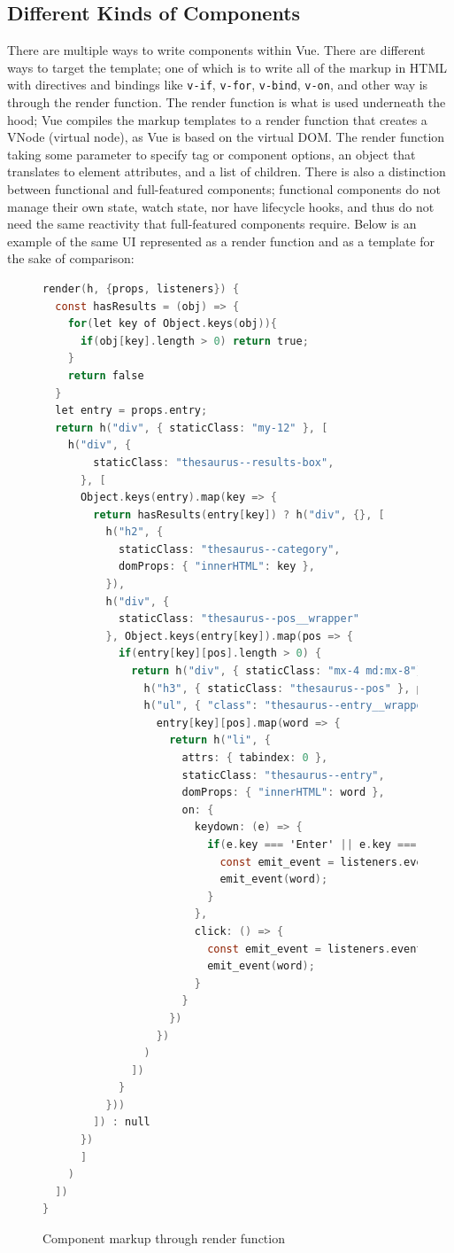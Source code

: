 \documentclass[11pt, twoside, reqno]{book}
\begin{document}
\subsection{Different Kinds of Components}

There are multiple ways to write components within Vue. There are different ways to target the template; one of which is to write all of the markup in HTML with directives and bindings like \texttt{v-if}, \texttt{v-for}, \texttt{v-bind}, \texttt{v-on}, and other way is through the render function. The render function is what is used underneath the hood; Vue compiles the markup templates to a render function that creates a VNode (virtual node), as Vue is based on the virtual DOM. The render function taking some parameter to specify tag or component options, an object that translates to element attributes, and a list of children. There is also a distinction between functional and full-featured components; functional components do not manage their own state, watch state, nor have lifecycle hooks, and thus do not need the same reactivity that full-featured components require. Below is an example of the same UI represented as a render function and as a template for the sake of comparison:
\begin{figure}
\footnotesize{
\begin{lstlisting}[language=C]
render(h, {props, listeners}) {
  const hasResults = (obj) => {
    for(let key of Object.keys(obj)){
      if(obj[key].length > 0) return true;
    }
    return false
  }
  let entry = props.entry;
  return h("div", { staticClass: "my-12" }, [
    h("div", {
        staticClass: "thesaurus--results-box",
      }, [
      Object.keys(entry).map(key => {
        return hasResults(entry[key]) ? h("div", {}, [
          h("h2", {
            staticClass: "thesaurus--category",
            domProps: { "innerHTML": key },
          }),
          h("div", {
            staticClass: "thesaurus--pos__wrapper"
          }, Object.keys(entry[key]).map(pos => {
            if(entry[key][pos].length > 0) {
              return h("div", { staticClass: "mx-4 md:mx-8"}, [
                h("h3", { staticClass: "thesaurus--pos" }, pos),
                h("ul", { "class": "thesaurus--entry__wrapper" }, 
                  entry[key][pos].map(word => {
                    return h("li", {
                      attrs: { tabindex: 0 },
                      staticClass: "thesaurus--entry",
                      domProps: { "innerHTML": word },
                      on: {
                        keydown: (e) => {
                          if(e.key === 'Enter' || e.key === ' ') {
                            const emit_event = listeners.event_from_child;
                            emit_event(word);
                          }
                        },
                        click: () => {
                          const emit_event = listeners.event_from_child;
                          emit_event(word);
                        }
                      }
                    })
                  })
                )
              ])
            }
          }))
        ]) : null
      })
      ] 
    )
  ])
}
\end{lstlisting}
}
\caption{Component markup through render function}
\end{figure}
\end{document}
